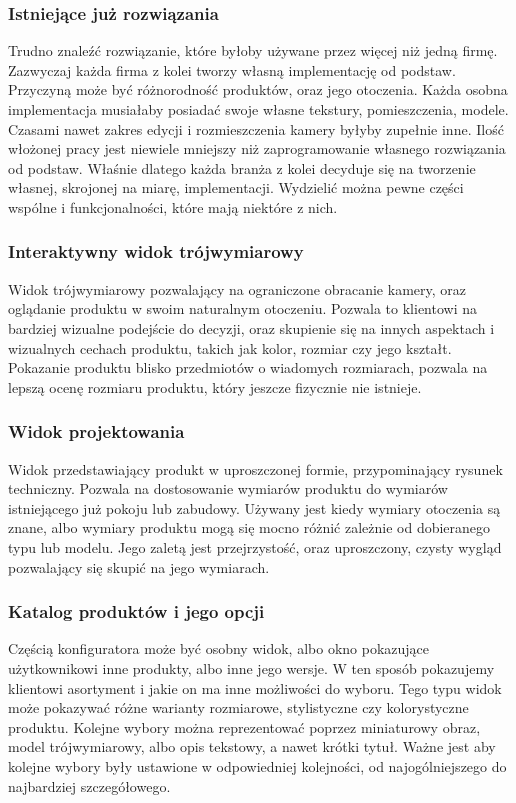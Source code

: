 \documentclass{article} %
\begin{document}
        \subsubsection{Istniejące już rozwiązania}
        Trudno znaleźć rozwiązanie, które byłoby używane przez więcej niż jedną firmę. Zazwyczaj każda firma z kolei tworzy własną implementację od podstaw. Przyczyną może być różnorodność produktów, oraz jego otoczenia. Każda osobna implementacja musiałaby posiadać swoje własne tekstury, pomieszczenia, modele. Czasami nawet zakres edycji i rozmieszczenia kamery byłyby zupełnie inne. Ilość włożonej pracy jest niewiele mniejszy niż zaprogramowanie własnego rozwiązania od podstaw. Właśnie dlatego każda branża z kolei decyduje się na tworzenie własnej, skrojonej na miarę, implementacji. Wydzielić można pewne części wspólne i funkcjonalności, które mają niektóre z nich. 
        \\
        
        
        \subsubsection{Interaktywny widok trójwymiarowy}
        Widok trójwymiarowy pozwalający na ograniczone obracanie kamery, oraz oglądanie produktu w swoim naturalnym otoczeniu. Pozwala to klientowi na bardziej wizualne podejście do decyzji, oraz skupienie się na innych aspektach i wizualnych cechach produktu, takich jak kolor, rozmiar czy jego kształt. Pokazanie produktu blisko przedmiotów o wiadomych rozmiarach, pozwala na lepszą ocenę rozmiaru produktu, który jeszcze fizycznie nie istnieje.
        \\
        
        \subsubsection{Widok projektowania}
        Widok przedstawiający produkt w uproszczonej formie, przypominający rysunek techniczny. Pozwala na dostosowanie wymiarów produktu do wymiarów istniejącego już pokoju lub zabudowy. Używany jest kiedy wymiary otoczenia są znane, albo wymiary produktu mogą się mocno różnić zależnie od dobieranego typu lub modelu. Jego zaletą jest przejrzystość, oraz uproszczony, czysty wygląd pozwalający się skupić na jego wymiarach.
        \\
        
        \subsubsection{Katalog produktów i jego opcji}
        Częścią konfiguratora może być osobny widok, albo okno pokazujące użytkownikowi inne produkty, albo inne jego wersje. W ten sposób pokazujemy klientowi asortyment i jakie on ma inne możliwości do wyboru. Tego typu widok może pokazywać różne warianty rozmiarowe, stylistyczne czy kolorystyczne produktu. Kolejne wybory można reprezentować poprzez miniaturowy obraz, model trójwymiarowy, albo opis tekstowy, a nawet krótki tytuł. Ważne jest aby kolejne wybory były ustawione w odpowiedniej kolejności, od najogólniejszego do najbardziej szczegółowego.
        \\
        
\end{document}
